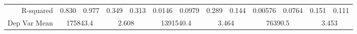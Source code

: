 \begin{tabular}{rrrrrrrrrrrrr}
R-squared & \multicolumn{1}{l}{0.830} & \multicolumn{1}{l}{0.977} & \multicolumn{1}{l}{0.349} & \multicolumn{1}{l}{0.313} & \multicolumn{1}{l}{0.0146} & \multicolumn{1}{l}{0.0979} & \multicolumn{1}{l}{0.289} & \multicolumn{1}{l}{0.144} & \multicolumn{1}{l}{0.00576} & \multicolumn{1}{l}{0.0764} & \multicolumn{1}{l}{0.151} & \multicolumn{1}{l}{0.111} \\
Dep Var Mean & \multicolumn{2}{c}{175843.4} & \multicolumn{2}{c}{2.608} & \multicolumn{2}{c}{1391540.4} & \multicolumn{2}{c}{3.464} & \multicolumn{2}{c}{76390.5} & \multicolumn{2}{c}{3.453} \\
\bottomrule
\bottomrule
\end{tabular}%
